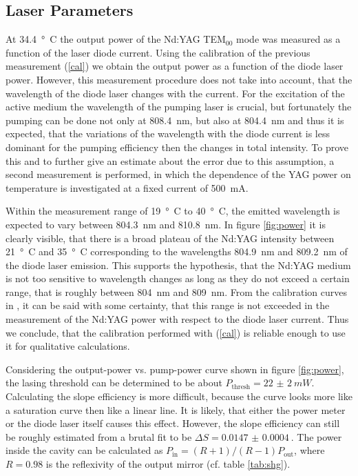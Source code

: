 \documentclass[a4paper]{scrartcl}
\numberwithin{equation}{section}
\numberwithin{figure}{section}
\numberwithin{table}{section}
\newcommand{\Formel}[1]{(\ref{#1})}
\begin{document}
\subsection{Laser Parameters}
At \SI{34.4}{\degree C} the output power of the Nd:YAG  TEM$_{00}$ mode was measured as a function of the laser diode current. Using the calibration of the previous measurement \Formel{cal} we obtain the output power as a function of the diode laser power. However, this measurement procedure does not take into account, that the wavelength of the diode laser changes with the current. For the excitation of the active medium the wavelength of the pumping laser is crucial, but fortunately the pumping can be done not only at \SI{808.4}{nm}, but also at \SI{804.4}{nm} and thus it is expected, that the variations of the wavelength with the diode current is less dominant for the pumping efficiency then the changes in total intensity. To prove this and to further give an estimate about the error due to this assumption, a second measurement is performed, in which the dependence of the YAG power on temperature is investigated at a fixed current of \SI{500}{mA}. 

Within the measurement range of \SI{19}{ \degree C} to \SI{40}{\degree  C}, the emitted wavelength is expected to vary between \SI{804.3}{nm} and \SI{810.8}{nm}. In figure \ref{fig:power} it is clearly visible, that there is a broad plateau of the Nd:YAG intensity between \SI{21}{\degree C} and \SI{35}{\degree C} corresponding to the wavelengths \SI{804.9}{nm} and \SI{809.2}{nm} of the diode laser emission. This supports the hypothesis, that the Nd:YAG medium is not too sensitive to wavelength changes as long as they do not exceed a certain range, that is roughly between \SI{804}{nm} and \SI{809}{nm}. From the calibration curves in \cite{script}, it can be said with some certainty, that this range is not exceeded in the measurement of the Nd:YAG power with respect to the diode laser current. Thus we conclude, that the calibration performed with \Formel{cal} is reliable enough to use it for qualitative calculations.

Considering the output-power vs. pump-power curve shown in figure \ref{fig:power}, the lasing threshold can be determined to be about $P_\text{thresh}=\SI{22(2)}{mW}$. Calculating the slope efficiency is more difficult, because the curve looks more like a saturation curve then like a linear line. It is likely, that either the power meter or the diode laser itself causes this effect. However, the slope efficiency can still be roughly estimated from a brutal fit to be $\Delta S = \SI{0.0147(4)}{}$. The power inside the cavity can be calculated as $P_\text{in}=(R+1)/(R-1) P_\text{out}$, where $R=0.98$ is the reflexivity of the output mirror (cf. table \ref{tab:shg}).
\end{document}
